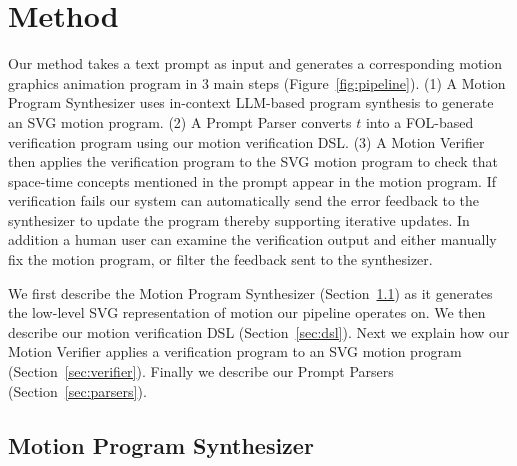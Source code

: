 \section{Method}
\label{sec:method}

Our method takes a text prompt as input and generates a corresponding
motion graphics animation program in 3 main steps
(Figure~\ref{fig:pipeline}).
%
(1) A Motion Program Synthesizer uses in-context LLM-based program
synthesis to generate an SVG motion program.
(2) A Prompt Parser converts $t$ into a FOL-based verification program
using our motion verification DSL.  
%
(3) A Motion Verifier then applies the verification program to the SVG motion program
to check that space-time concepts mentioned in the prompt appear in the motion program.
%
If verification fails our system can automatically send the error
feedback to the synthesizer to update the program thereby supporting
iterative updates.
%
In addition a human user can examine the verification output and either
manually fix the motion program, or filter the feedback sent to the
synthesizer. 

We first describe the Motion Program Synthesizer (Section~\ref{sec:synthesizer}) as
it generates the low-level SVG representation of motion our pipeline
operates on. We then describe our motion verification DSL
(Section~\ref{sec:dsl}). Next we explain how our Motion Verifier applies a
verification program to an SVG motion program
(Section~\ref{sec:verifier}). Finally we describe our Prompt Parsers
(Section~\ref{sec:parsers}).



\subsection{Motion Program Synthesizer}
\label{sec:synthesizer}

